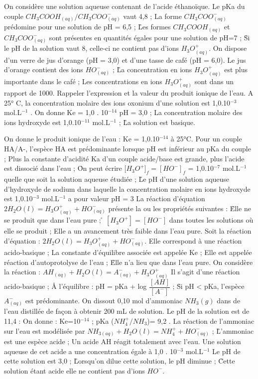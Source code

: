  \q	
On considère une solution aqueuse contenant de l'acide éthanoïque.
Le pKa du couple $CH_3COOH_{(aq)}/ CH_3COO^{-}_{(aq)}$  vaut 4,8 ;
\rv
La forme $CH_3COO^{-}_{(aq)}$  prédomine  pour une solution de pH = 6,5 ;
\r
Les formes $CH_3COOH_{(aq)}$ et $CH_3COO^{-}_{(aq)}$ sont présentes en quantités égales pour une solution de pH=7 ;
\r
Si le pH de la solution vaut 8, celle-ci ne contient pas d'ions $H_3O^+_{(aq)}$.
\q
On dispose d'un verre de jus d'orange (pH = 3,0) et d'une tasse de café (pH = 6,0). 
\rv
Le jus d'orange contient des ions $HO^{-}_{(aq)}$ ; 
\r
La concentration en ions $H_3O^+_{(aq)}$  est plus importante dans le café ;
\rv
Les concentrations en ions $H_3O^+_{(aq)}$ sont dans un rapport de  1000.
\q
Rappeler l'expression et la valeur du produit ionique de l'eau.
 \q	
A 25° C, la concentration molaire des ions oxonium d'une solution est 1,0.10$^{-3}$ mol.L$^{-1}$ . 
On donne Ke = 1,0 . 10$^{-14}$ 
\rv
pH = 3,0 ;
\rv La concentration molaire des ions hydroxyde est 1,0.10$^{-11}$ mol.L$^{-1}$ ;
\r
La solution est basique.

\q	
On donne le produit ionique de l'eau : Ke = 1,0.10$^{-14}$ à 25°C.
\rv
Pour un couple HA/A-, l'espèce HA est prédominante lorsque pH est inférieur au pKa du couple ;
\rv
Plus la constante d'acidité Ka d'un couple acide/base est grande, plus l'acide est dissocié dans l'eau ;
\r
On peut écrire [$H_3O^+]_f = [HO^{-}]_f$ = 1,0.10$^{-7}$ mol.L$^{-1}$ quelle que soit la solution aqueuse étudiée ;
\r	
Le pH d'une solution aqueuse d'hydroxyde de sodium dans laquelle la concentration molaire en ions hydroxyde est 1,0.10$^{-3}$ mol.L$^{-1}$ a pour valeur pH = 3 
\q	
La réaction d'équation $2 H_2O(l) = H_3O^+_{(aq)}  + HO^{-}_{(aq)}$ présente la ou les propriétés suivantes :
\r
Elle ne se produit que dans l'eau pure ; 
\r
$[H_3O^+] = [HO^{-}]$  dans toutes les solutions où elle se produit ;
\rv
Elle a un avancement très faible dans l'eau pure.
 \q	
Soit la réaction d'équation :	$2 H_2O(l) = H_3O^+_{(aq)}  +  HO^{-}_{(aq)}.$
\rv
Elle correspond à une réaction acido-basique ;
\rv
La constante d'équilibre associée est appelée Ke ; 
\rv
Elle est appelée réaction d'autoprotolyse de l'eau ;
\r
Elle n'a lieu que dans l'eau pure.
   \q	On considère la réaction :	 $AH_{(aq)} + H_2O(l) = A^-_{(aq)} + H_3O^+_{(aq)}$
\rv
Il s'agit d'une réaction acido-basique ;
\r 	
A l'équilibre : pH = pKa + log $\dfrac{[AH]}{[A^-]}$  ;
\r
Si pH < pKa, l'espèce $A^-_{(aq)}$ est prédominante.
\q
On dissout 0,10 mol d'ammoniac $NH_3(g)$ dans de l'eau distillée de façon à obtenir 200 mL de solution.
Le pH de la solution est de 11,4 :
On donne :    Ke=10$^{-14}$ ;     pKa ($NH_4^+/NH_3$)=  9,2 .
\rv
La réaction de l'ammoniac sur l'eau est modélisée par $NH_{3(aq)} + H_2O(l) = NH_4^+ + HO^{-}_{(aq)}$ ;
\r
L'ammoniac est une espèce acide ;
\q	
Un acide AH réagit totalement avec l'eau. Une solution aqueuse de cet acide a une concentration égale à 1,0 . 10$^{-3}$ mol.L$^{-1}$ 
\rv
Le pH de cette solution est 3,0 ;
\r
Lorsqu'on dilue cette solution, le pH diminue ;
\r
Cette solution étant acide elle ne contient pas d'ions $HO^{-}$.

  
